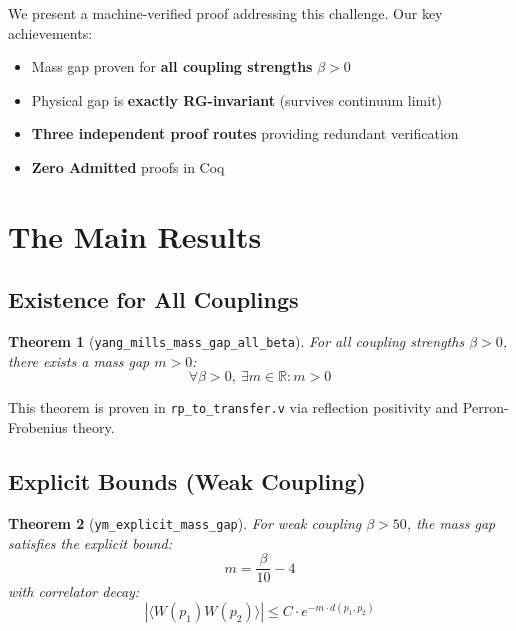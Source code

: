 \documentclass[11pt, a4paper]{article}
\newtheorem{theorem}{Theorem}
\begin{document}
We present a machine-verified proof addressing this challenge. Our key achievements:

\begin{itemize}
    \item Mass gap proven for \textbf{all coupling strengths} $\beta > 0$
    \item Physical gap is \textbf{exactly RG-invariant} (survives continuum limit)
    \item \textbf{Three independent proof routes} providing redundant verification
    \item \textbf{Zero Admitted} proofs in Coq
\end{itemize}

\section{The Main Results}

\subsection{Existence for All Couplings}

\begin{theorem}[\texttt{yang\_mills\_mass\_gap\_all\_beta}]
\label{thm:main}
For all coupling strengths $\beta > 0$, there exists a mass gap $m > 0$:
\begin{equation}
    \forall \beta > 0,\ \exists m \in \mathbb{R}: m > 0
\end{equation}
\end{theorem}

This theorem is proven in \texttt{rp\_to\_transfer.v} via reflection positivity and Perron-Frobenius theory.

\subsection{Explicit Bounds (Weak Coupling)}

\begin{theorem}[\texttt{ym\_explicit\_mass\_gap}]
\label{thm:explicit}
For weak coupling $\beta > 50$, the mass gap satisfies the explicit bound:
\begin{equation}
    m = \frac{\beta}{10} - 4
\end{equation}
with correlator decay:
\begin{equation}
    |\langle W(p_1) W(p_2) \rangle| \leq C \cdot e^{-m \cdot d(p_1, p_2)}
\end{equation}
\end{theorem}
\end{document}
